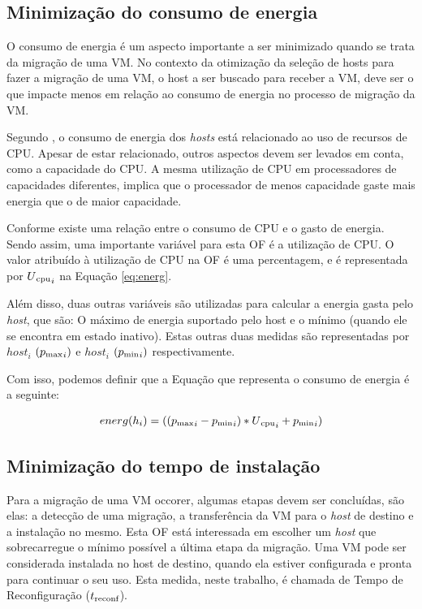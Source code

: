 \subsection{Minimização do consumo de energia}
O consumo de energia é um aspecto importante a ser minimizado quando
se trata da migração de uma VM. No contexto da otimização da seleção 
de hosts para fazer a migração de uma VM, o host a ser buscado
para receber a VM, deve ser o que impacte menos em relação ao consumo de 
energia no processo de migração da VM.

Segundo \cite{beloglazov}, o consumo de energia dos \textit{hosts} está relacionado
ao uso de recursos de CPU. Apesar de estar relacionado, outros aspectos devem ser levados
em conta, como a capacidade do CPU. A mesma utilização de CPU em processadores de capacidades
diferentes, implica que o processador de menos capacidade gaste mais energia que o de maior capacidade.

Conforme \cite{beloglazov} existe uma relação entre o consumo de CPU e o gasto de energia. Sendo assim,
uma importante variável para esta OF é a utilização de CPU. O valor atribuído à utilização de CPU na OF é uma 
percentagem, e é representada por $ U\textsubscript{cpu}_i $ na Equação \ref{eq:energ}. 

Além disso, duas outras variáveis são utilizadas para calcular a energia gasta pelo \textit{host}, que são:
O máximo de energia suportado pelo host e o mínimo (quando ele se encontra em estado inativo). Estas outras duas
medidas são representadas por $ host_i $ $ (p\textsubscript{max}_i) $ e $ host_i $ $ (p\textsubscript{min}_i) $
respectivamente.

Com isso, podemos definir que a Equação que representa o consumo de energia é a seguinte:

\begin{equation}
energ(h_i ) =  ((p\textsubscript{max}_i - p\textsubscript{min}_i) * U\textsubscript{cpu}_i + p\textsubscript{min}_i) 
\label{eq:energ}
\end{equation}

\subsection{Minimização do tempo de instalação}

Para a migração de uma VM occorer, algumas etapas devem ser concluídas, são elas: 
a detecção de uma migração, a transferência da VM para o \textit{host} de destino 
e a instalação no mesmo. Esta OF está interessada em escolher um \textit{host} que 
sobrecarregue o mínimo possível a última etapa da migração. Uma VM pode ser considerada
instalada no host de destino, quando ela estiver configurada e pronta para continuar o seu
uso. Esta medida, neste trabalho, é chamada de Tempo de Reconfiguração ($ t\textsubscript{reconf} $).

